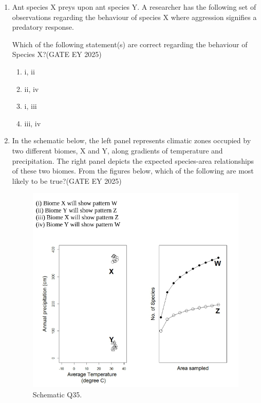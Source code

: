 \begin{enumerate}[leftmargin=*,label=\textbf{Q.\arabic*},resume]
\item Ant species X preys upon ant species Y. A researcher has the following set of observations regarding the behaviour of species X where aggression signifies a predatory response.




Which of the following statement(s) are correct regarding the behaviour of Species X?\hfill {(GATE EY 2025)}
\begin{multicols}{2}
\begin{enumerate}
\item i, ii
\item ii, iv
\item i, iii
\item iii, iv
\end{enumerate}
\end{multicols}

\item In the schematic below, the left panel represents climatic zones occupied by two different biomes, X and Y, along gradients of temperature and precipitation. The right panel depicts the expected species-area relationships of these two biomes. From the figures below, which of the following are most likely to be true?\hfill {(GATE EY 2025)}
\begin{figure}[H]
  \centering
  \includegraphics[width=0.9\columnwidth]{figs/imageQ35.png}
  \caption{Schematic Q35.}
  \label{fig:q35-schematic}
\end{figure}



\end{enumerate}
